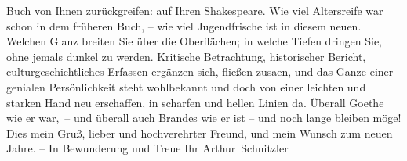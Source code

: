 \begin{ledgroupsized}[t]{13cm}
                        Buch von Ihnen zurückgreifen: auf Ihren Shakespeare. Wie viel Altersreife
                        war schon in dem früheren Buch, – wie viel Jugendfrische \introOben{}ist\introOben{} in diesem neuen. Welchen Glanz breiten Sie über
                        die Oberflächen; in welche Tiefen dringen Sie, ohne jemals dunkel zu werden.
                        {\pb}Kritische Betrachtung,
                        historischer Bericht, culturgeschichtliches Erfassen ergänzen sich, fließen
                        zusa{\geminationm}en, und das Ganze einer genialen
                        Persönlichkeit steht wohlbekannt und doch von einer leichten und starken
                        Hand neu erschaffen, in scharfen und hellen Linien da. Überall Goethe wie er
                        war, – und überall auch Brandes wie er ist – und noch lange bleiben möge!
                        Dies mein Gruß, lieber und hochverehrter Freund, und mein Wunsch zum neuen
                        Jahre. – In Bewunderung und Treue\pend
           \pstart Ihr \spacefill\mbox{Arthur Schnitzler}\pend{}          \endnumbering{}\end{ledgroupsized}  \newcommand{\dateiname}{L02372}\newcommand{\titel}{Arthur Schnitzler an Georg Brandes, 28. 12. 1921}\newcommand{\editorInnen}{Martin Anton Müller und Gerd-Hermann Susen}
      